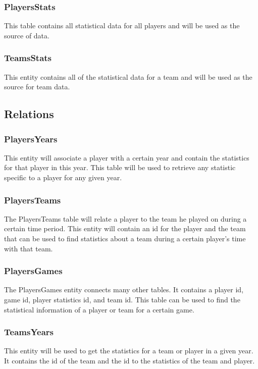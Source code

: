 \documentclass[12pt,letterpaper]{article}
\begin{document}
\subsubsection{PlayersStats}
This table contains all statistical data for all players and will be used as the source of data.

\subsubsection{TeamsStats}
This entity contains all of the statistical data for a team and will be used as the source for team data.

\subsection{Relations}
\subsubsection{PlayersYears}
This entity will associate a player with a certain year and contain the statistics for that player in this year. This table will be used to retrieve any statistic specific to a player for any given year. 

\subsubsection{PlayersTeams}
The PlayersTeams table will relate a player to the team he played on during a certain time period. This entity will contain an id for the player and the team that can be used to find statistics about a team during a certain player's time with that team. 
\subsubsection{PlayersGames}
The PlayersGames entity connects many other tables. It contains a player id, game id, player statistics id, and team id. This table can be used to find the statistical information of a player or team for a certain game. 

\subsubsection{TeamsYears}
This entity will be used to get the statistics for a team or player in a given year. It contains the id of the team and the id to the statistics of the team and player.
\clearpage\null

\end{document}
